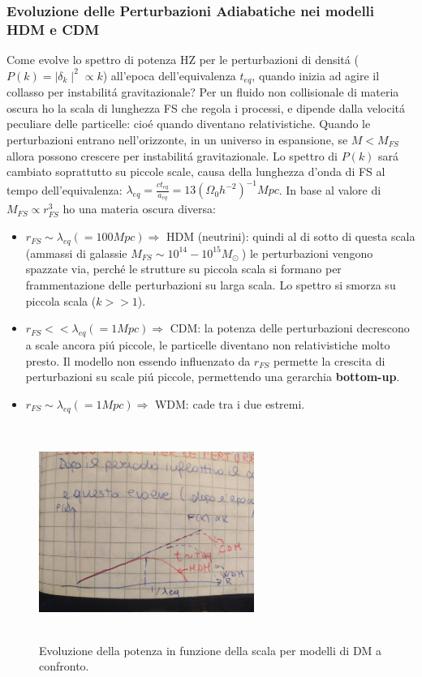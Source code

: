 \documentclass[12pt, a4paper]{article}
\begin{document}
\subsubsection{Evoluzione delle Perturbazioni Adiabatiche nei modelli HDM e CDM}
Come evolve lo spettro di potenza HZ per le perturbazioni di densit\'{a} ($P(k)=\mid \delta_k\mid^2\propto k$) all'epoca dell'equivalenza $t_{eq}$, quando inizia ad agire il collasso per instabilit\'{a} gravitazionale?
Per un fluido non collisionale di materia oscura ho la scala di lunghezza FS che regola i processi, e dipende dalla velocit\'{a} peculiare delle particelle: cio\'{e} quando diventano relativistiche. Quando le perturbazioni entrano nell'orizzonte, in un universo in espansione, se $M<M_{FS}$ allora possono crescere per instabilit\'{a} gravitazionale. Lo spettro di $P(k)$ sar\'{a} cambiato soprattutto su piccole scale, causa della lunghezza d'onda di FS al tempo dell'equivalenza: $\lambda_{eq}=\frac{ct_{eq}}{a_{eq}}=13(\Omega_0 h^{-2})^{-1}Mpc$. In base al valore di $M_{FS} \propto r_{FS}^3$ ho una materia oscura diversa:
\begin{itemize}
\item $r_{FS}\sim \lambda_{eq} (=100 Mpc) \Rightarrow$ HDM (neutrini): quindi al di sotto di questa scala (ammassi di galassie $M_{FS}\sim 10^{14}-10^{15} M_\odot\ $) le perturbazioni vengono spazzate via, perch\'{e} le strutture su piccola scala si formano per frammentazione delle perturbazioni su larga scala. Lo spettro si smorza su  piccola scala ($k>>1$).
\item $r_{FS}<< \lambda_{eq} (=1 Mpc) \Rightarrow$ CDM: la potenza delle perturbazioni decrescono a scale ancora pi\'{u} piccole, le particelle diventano non relativistiche molto presto. Il modello non essendo influenzato da $r_{FS}$ permette la crescita di perturbazioni su scale pi\'{u} piccole, permettendo una gerarchia \textbf{bottom-up}.
\item $r_{FS}\sim \lambda_{eq} (=1 Mpc) \Rightarrow$ WDM: cade tra i due estremi.
\end{itemize}
\begin{figure}[htp]
\centering
\includegraphics[width=7cm, height=7cm]{images/cdm.jpeg}
\caption{Evoluzione della potenza in funzione della scala per modelli di DM a confronto.}
\label{fig:cdm}
\end{figure}
\end{document}

